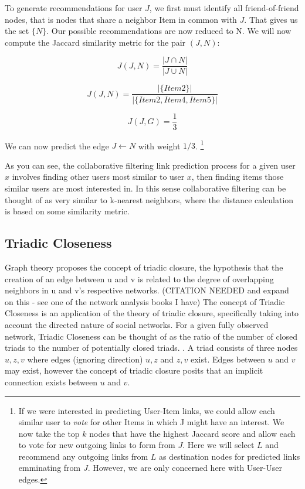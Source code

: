 To generate recommendations for user $J$, we first must identify all friend-of-friend nodes, that is nodes that share a neighbor Item in common with $J$. That gives us the set $\{N\}$. Our possible recommendations are now reduced to N. We will now compute the Jaccard similarity metric for the pair $(J, N)$:

\begin{equation}
\label{jaccard}
J(J,N) = \frac{|J \cap N|}{|J \cup N|}
\end{equation}

\begin{equation}
\label{jaccard}
J(J,N) = \frac{|\{Item2\}|}{|\{Item2, Item4, Item5\}|}
\end{equation}

\begin{equation}
\label{jaccard}
J(J,G) = \frac{1}{3}
\end{equation}

We can now predict the edge $J \leftarrow N$ with weight $1/3$. \footnote{If we were interested in predicting User-Item links, we could allow each similar user to \textit{vote} for other Items in which J might have an interest. We now take the top $k$ nodes that have the highest Jaccard score and allow each to vote for new outgoing links to form from $J$. Here we will select $L$ and recommend any outgoing links from $L$ as destination nodes for predicted links emminating from $J$. However, we are only concerned here with User-User edges.}

As you can see, the collaborative filtering link prediction process for a given user $x$ involves finding other users most similar to user $x$, then finding items those similar users are most interested in. In this sense collaborative filtering can be thought of as very similar to k-nearest neighbors, where the distance calculation is based on some similarity metric.

\subsection{Triadic Closeness}
Graph theory proposes the concept of triadic closure, the hypothesis that the creation of an edge between u and v is related to the degree of overlapping neighbors in u and v's respective networks. (CITATION NEEDED and expand on this - see one of the network analysis books I have) The concept of Triadic Closeness is an application of the theory of triadic closure, specifically taking into account the directed nature of social networks. For a given fully observed network, Triadic Closeness can be thought of as the ratio of the number of closed triads to the number of potentially closed triads. \cite{Schall2014}. A triad consists of three nodes $u, z, v$ where edges (ignoring direction) $u,z$ and $z,v$ exist. Edges between $u$ and $v$ may exist, however the concept of triadic closure posits that an implicit connection exists between $u$ and $v$.

